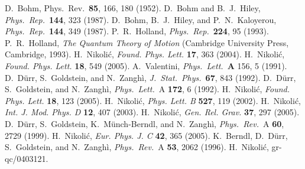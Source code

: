 \documentclass[10pt,twoside]{aipproc} %
\begin{document}
\begin{thebibliography}{99}

D.~Bohm, Phys.~Rev.~{\bf 85}, 166, 180 (1952).
D.~Bohm and B.~J.~Hiley,
{\it Phys.~Rep.}~{\bf 144}, 323 (1987).
D.~Bohm, B.~J.~Hiley, and P.~N.~Kaloyerou,
{\it Phys.~Rep.}~{\bf 144}, 349 (1987).
P.~R.~Holland, {\it Phys.~Rep.}~{\bf 224}, 95 (1993).
P.~R.~Holland, {\it The Quantum Theory of Motion}
(Cambridge University Press, Cambridge, 1993).
H.~Nikoli\'c, {\it Found. Phys. Lett.} {\bf 17}, 363 (2004).
H.~Nikoli\'c, {\it Found. Phys. Lett.} {\bf 18}, 549 (2005).
A.~Valentini, {\it Phys.~Lett.}~{\bf A} 156, 5 (1991).
D.~D\"urr, S.~Goldstein, and N.~Zangh\`i,
{\it J.~Stat.~Phys.}~{\bf 67}, 843 (1992).
D.~D\"urr, S.~Goldstein, and N.~Zangh\`i,
{\it Phys.~Lett.}~A {\bf 172}, 6 (1992).
H.~Nikoli\'c, {\it Found. Phys. Lett.} {\bf 18}, 123 (2005).
H.~Nikoli\'c, {\it Phys. Lett. B} {\bf 527}, 119 (2002).
H.~Nikoli\'c, {\it Int. J. Mod. Phys. D} {\bf 12}, 407 (2003).
H.~Nikoli\'c, {\it Gen. Rel. Grav.} {\bf 37}, 297 (2005).
D.~D\"urr, S.~Goldstein, K.~M\"unch-Berndl, and N.~Zangh\`i,
{\it Phys.~Rev.}~A {\bf 60}, 2729 (1999).
H.~Nikoli\'c, {\it Eur. Phys. J. C} {\bf 42}, 365 (2005).
K.~Berndl, D.~D\"urr, S.~Goldstein, and N.~Zangh\`i,
{\it Phys.~Rev.}~A {\bf 53}, 2062 (1996).
H.~Nikoli\'c, gr-qc/0403121.

\end{thebibliography}
\end{document}
